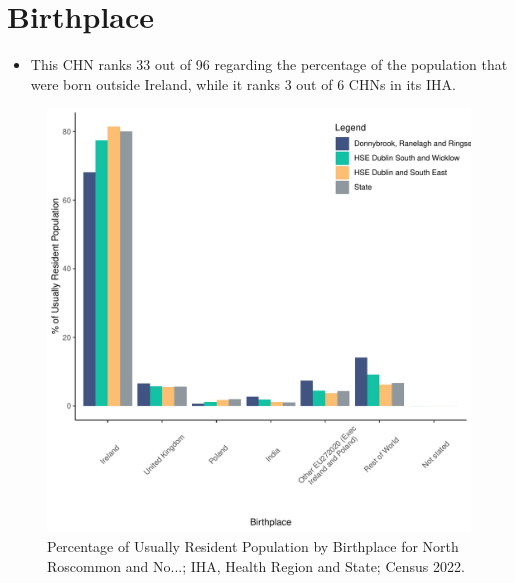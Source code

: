 \documentclass{article}
\begin{document}
\section{Birthplace}\label{sect:Birth}
\begin{itemize}
\item This CHN ranks  33 out of 96 regarding the percentage of the population that were born outside Ireland, while it ranks  3 out of 6 CHNs in its IHA.
\end{itemize}
\begin{figure}[H]
	\centering
	\includegraphics[width = 130mm]{../figures/BirthED.pdf}
	\caption{Percentage of Usually Resident Population by Birthplace for North Roscommon and No...; IHA, Health Region and State; Census 2022.}
	\label{fig:vbnv}
	\end{figure}
	
\end{document}
